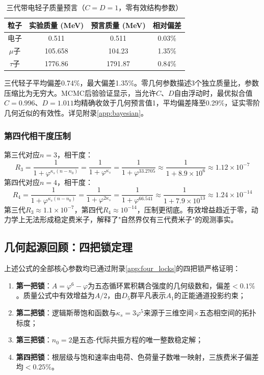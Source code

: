 \documentclass[12pt,a4paper,twocolumn]{article}
\renewcommand{\phi}{\varphi}
\begin{document}
\begin{table}[H]
\centering
\footnotesize
\caption{三代带电轻子质量预言（$C=D=1$，零有效结构参数）}
\begin{tabular}{c|c|c|c}
\hline
\textbf{粒子} & \textbf{实验质量 (MeV)} & \textbf{预言质量 (MeV)} & \textbf{相对偏差} \\
\hline
电子 & 0.511 & 0.511 & 0.03\% \\
$\mu$子 & 105.658 & 104.23 & 1.35\% \\
$\tau$子 & 1776.86 & 1791.87 & 0.84\% \\
\hline
\end{tabular}
\end{table}

三代轻子平均偏差0.74\%，最大偏差1.35\%。零几何参数描述3个独立质量比，参数压缩比为无穷大。MCMC后验验证显示，当允许$C$、$D$自由浮动时，最优拟合值$C=0.996$、$D=1.011$均精确收敛于几何预言值1，平均偏差降至0.29\%，证实零阶几何近似的有效性。详见附录\ref{app:bayesian}。

\subsubsection{第四代相干度压制}
第三代对应$n=3$，相干度：
\[
R_3 = \frac{1}{1+\phi^{\kappa_s(n-n_0)}} = \frac{1}{1+\phi^{\kappa_s}} = \frac{1}{1+\phi^{33.2705}} \approx \frac{1}{1+8.9\times 10^{6}} \approx 1.12 \times 10^{-7}
\]
第四代对应$n=4$，相干度：
\[
R_4 = \frac{1}{1+\phi^{\kappa_s(n-n_0)}} = \frac{1}{1+\phi^{2\kappa_s}} = \frac{1}{1+\phi^{66.541}} \approx \frac{1}{1+7.9\times 10^{13}} \approx 1.24 \times 10^{-14}
\]
第三代$R_3\approx1.1\times10^{-7}$，第四代$R_4\approx10^{-14}$，压制更彻底。有效增益趋近于零，动力学上无法形成稳定费米子，解释了"自然界仅有三代费米子"的观测事实。

\subsection{几何起源回顾：四把锁定理}
上述公式的全部核心参数均已通过附录\ref{app:four_locks}的四把锁严格证明：
\begin{enumerate}
\item \textbf{第一把锁}：$A = \phi^6-\phi$为五态循环累积耦合强度的几何级数和，偏差$<0.1\%$。质量公式中有效增益为$A/2$，由$D_5$群平凡表示$A_1$的正能通道投影约束；
\item \textbf{第二把锁}：逻辑斯蒂饱和函数与$\kappa_s = 3\phi^5$来源于三维空间$\times$五态相空间的拓扑标度；
\item \textbf{第三把锁}：$n_0 = 2$是五态-代际共振方程的唯一整数稳定解；
\item \textbf{第四把锁}：根层级与饱和速率由电荷、色荷量子数唯一映射，三族费米子偏差均$<0.25\%$。
\end{enumerate}
\end{document}
